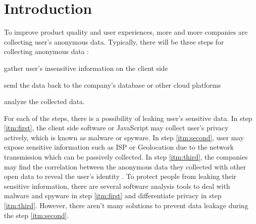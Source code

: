 \documentclass[twocolumn]{article}
\begin{document}
\section{Introduction}
To improve product quality and user experiences, more and more companies are collecting user's anonymous data. Typically, there will be three steps for collecting anonymous data \cite{papadimitriou2016big}:
\begin{enumerate*}[label=(\roman*)]
    \item \label{itm:first} gather user's insensitive information on the client side
    \item \label{itm:second} send the data back to the company's database or other cloud platforms \cite{papadimitriou2016big}
    \item \label{itm:third} analyze the collected data.
\end{enumerate*}
For each of the steps, there is a possibility of leaking user's sensitive data. In step \ref{itm:first}, the client side software or JavaScript may collect user's privacy actively, which is known as malware or spyware. In step \ref{itm:second}, user may expose sensitive information such as ISP or Geolocation due to the network transmission which can be passively collected. In step \ref{itm:third}, the companies may find the correlation between the anonymous data they collected with other open data to reveal the user's identity \cite{bittau2017prochlo}. To protect people from leaking their sensitive information, there are several software analysis tools to deal with malware and spyware in step \ref{itm:first} \cite{herley2015spyware} and differentiate privacy \cite{bittau2017prochlo} in step \ref{itm:third}. However, there aren't many solutions to prevent data leakage during the step \ref{itm:second}.
\end{document}
